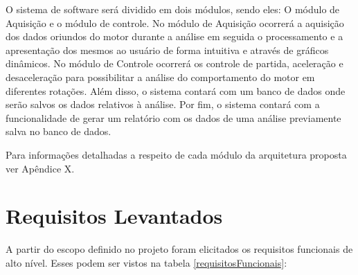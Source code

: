 O sistema de software será dividido em dois módulos, sendo eles: O módulo de Aquisição e o módulo de controle. No módulo de Aquisição ocorrerá a aquisição dos dados oriundos do motor durante a análise em seguida o processamento e a apresentação dos mesmos ao usuário de forma intuitiva e através de gráficos dinâmicos. No módulo de Controle ocorrerá os controle de partida, aceleração e desaceleração para possibilitar a análise do comportamento do motor em diferentes rotações. Além disso, o sistema contará com um banco de dados onde serão salvos os dados relativos à análise. Por fim, o sistema contará com a funcionalidade de gerar um relatório com os dados de uma análise previamente salva no banco de dados.

Para informações detalhadas a respeito de cada módulo da arquitetura proposta ver Apêndice X.


\section{Requisitos Levantados}

A partir do escopo definido no projeto foram elicitados os requisitos funcionais de alto nível. Esses podem ser vistos na tabela \ref{requisitosFuncionais}:

